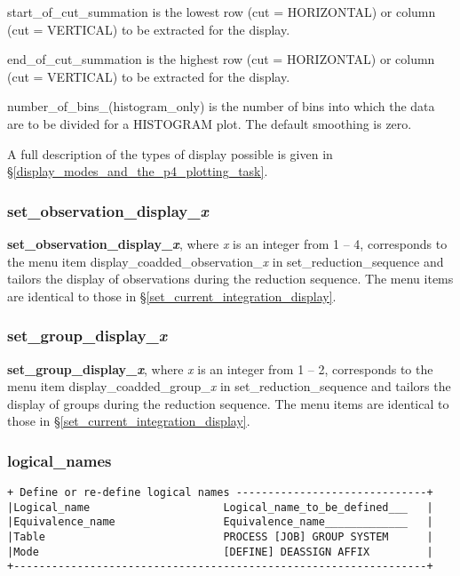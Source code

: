{{\sf start\_of\_cut\_summation} is the lowest row (cut = {\sf HORIZONTAL}) 
or column (cut = {\sf VERTICAL}) to be extracted for the display.

{\sf end\_of\_cut\_summation} is the highest row (cut = {\sf HORIZONTAL}) 
or column (cut = {\sf VERTICAL}) to be extracted for the display.

{\sf number\_of\_bins\_(histogram\_only)} is the number of bins into which 
the data are to be divided for a {\sf HISTOGRAM} plot. The default smoothing
is zero.

A full description of the types of display possible is given in 
\S \ref{display_modes_and_the_p4_plotting_task}.

\subsubsection{set\_observation\_display\_{\em x}}
\label{set_observation_display_x}

{\bf set\_observation\_display\_{\em x}}, where {\em x} is an integer from 
1 -- 4, corresponds to the menu item 
{\sf display\_coadded\_observation\_{\em x}} in 
{\sf set\_reduction\_sequence} and tailors the display of 
observations during the reduction sequence. The menu items are identical to 
those in \S \ref{set_current_integration_display}.

\subsubsection{set\_group\_display\_{\em x}}
\label{set_group_display_x}

{\bf set\_group\_display\_{\em x}}, where {\em x} is an integer from 1 -- 2,
corresponds to the menu item {\sf display\_coadded\_group\_{\em x}} in 
{\sf set\_reduction\_sequence} and tailors the display of groups
during the reduction sequence. The menu items are identical to those in 
\S \ref{set_current_integration_display}.

\subsubsection{logical\_names}
\label{logical_names}
\begin{verbatim}
+ Define or re-define logical names ------------------------------+
|Logical_name                     Logical_name_to_be_defined___   |
|Equivalence_name                 Equivalence_name_____________   |
|Table                            PROCESS [JOB] GROUP SYSTEM      |
|Mode                             [DEFINE] DEASSIGN AFFIX         |
+-----------------------------------------------------------------+
\end{verbatim}

}
